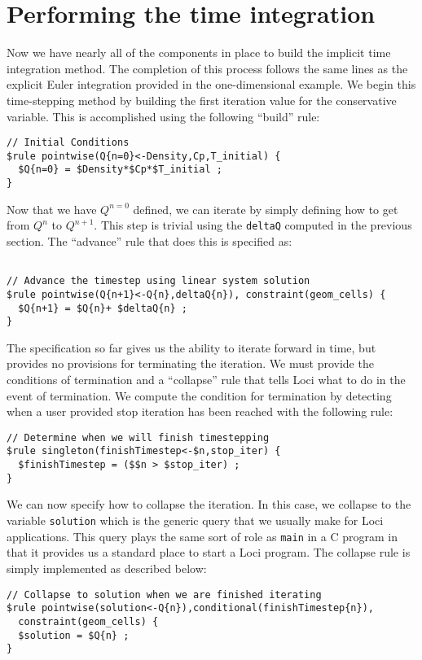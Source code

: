 \documentclass[10pt,epsf,letterpaper,twoside]{book}
\begin{document}
\section{Performing the time integration}

Now we have nearly all of the components in place to build the
implicit time integration method.  The completion of this process
follows the same lines as the explicit Euler integration provided in
the one-dimensional example.  We begin this time-stepping method by
building the first iteration value for the conservative variable.
This is accomplished using the following ``build'' rule:
\begin{verbatim}
// Initial Conditions
$rule pointwise(Q{n=0}<-Density,Cp,T_initial) {
  $Q{n=0} = $Density*$Cp*$T_initial ;
}
\end{verbatim}
Now that we have $Q^{n=0}$ defined, we can iterate by simply defining
how to get from $Q^n$ to $Q^{n+1}$.  This step is trivial using the
{\tt deltaQ} computed in the previous section.  The ``advance'' rule
that does this is specified as:
\begin{verbatim}

// Advance the timestep using linear system solution
$rule pointwise(Q{n+1}<-Q{n},deltaQ{n}), constraint(geom_cells) {
  $Q{n+1} = $Q{n}+ $deltaQ{n} ;
}
\end{verbatim}

The specification so far gives us the ability to iterate forward in
time, but provides no provisions for terminating the iteration.  We
must provide the conditions of termination and a ``collapse'' rule
that tells Loci what to do in the event of termination.  We compute
the condition for termination by detecting when a user provided stop
iteration has been reached with the following rule:
\begin{verbatim}
// Determine when we will finish timestepping
$rule singleton(finishTimestep<-$n,stop_iter) {
  $finishTimestep = ($$n > $stop_iter) ;
}
\end{verbatim}

We can now specify how to collapse the iteration.  In this case, we
collapse to the variable {\tt solution} which is the generic query
that we usually make for Loci applications.  This query plays the same
sort of role as {\tt main} in a C program in that it provides us a
standard place to start a Loci program.  The collapse rule is simply
implemented as described below:
\begin{verbatim}
// Collapse to solution when we are finished iterating
$rule pointwise(solution<-Q{n}),conditional(finishTimestep{n}),
  constraint(geom_cells) {
  $solution = $Q{n} ;
}
\end{verbatim}
\end{document}
